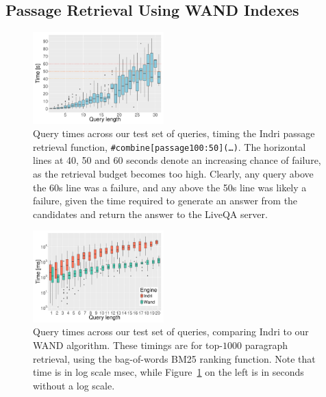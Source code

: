 \documentclass[a4paper,10pt,conference,compsocconf,final]{IEEEtran}
\newcommand{\shane}[1]{\textrm{\textcolor{orange}{Shane says: #1}}}
\newcommand{\ruey}[1]{\textrm{\textcolor{red}{Ruey says: #1}}}
\newcommand{\joel}[1]{\textrm{\textcolor{magenta}{Joel says: #1}}}
\begin{document}
\subsection{Passage Retrieval Using WAND Indexes}\label{sec:wand}
\begin{figure}[t]
\centering
\includegraphics[width=0.45\textwidth]{indri-passage.pdf}
\caption{Query times across our test set of queries, timing the Indri
passage retrieval function,
{\texttt{\#combine[passage100:50](\ldots)}}.
The horizontal lines at 40, 50 and 60 seconds denote an increasing
chance of failure, as the retrieval budget becomes too high.
Clearly, any query above the 60s line was a failure, and any above
the 50s line was likely a failure, given the time required to
generate an answer from the candidates and return the answer to the
LiveQA server.}
\label{fig:indri-passage}
\end{figure}


\begin{figure}[t]
\centering
\includegraphics[width=0.45\textwidth]{timing.pdf}
\caption{Query times across our test set of queries, comparing Indri
to our WAND algorithm.
These timings are for top-$1000$ paragraph retrieval, using the bag-of-words 
BM25 ranking function. Note that time is in log scale msec, while 
Figure~{\ref{fig:indri-passage}} on the left is in seconds without a log scale.}
\label{fig:timing}
\end{figure}

\end{document}
